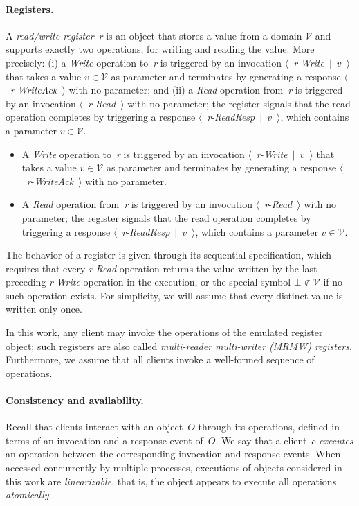 \documentclass[oribibl]{llncs}
\theoremstyle{definition-boldhead}
\newcommand{\var}[1]{\textit{#1}}
\newcommand{\op}[1]{\textsl{#1}}
\newcommand{\event}[2]{$\langle$~{\var{#1}}-\textsl{#2}~$\rangle$}
\newcommand{\eventt}[3]{$\langle$~{\var{#1}}-\textsl{#2}~$\mid$~{#3}~$\rangle$}
\newcommand{\values}{\ensuremath{\mathcal{V}}\xspace}
\begin{document}
\paragraph{Registers.}
A \emph{read/write register}~\var{r} is an object that stores a value from
a domain \values and supports exactly two operations, for writing and
reading the value.  More precisely:
\if\submit\yes
(i) a \emph{Write} operation to~\var{r} is triggered by an invocation \eventt{r}{Write}{$v$} that takes a value $v \in \values$ as parameter and terminates by generating a response \event{r}{WriteAck} with no parameter; and (ii) a \emph{Read} operation from~\var{r} is triggered by an invocation \event{r}{Read} with no parameter; the register signals that the read operation completes by triggering a response \eventt{r}{ReadResp}{$v$}, which contains a parameter $v \in \values$.
\else
\begin{itemize}
\item A \emph{Write} operation to~\var{r} is triggered by an
  invocation \eventt{r}{Write}{$v$} that takes a value $v \in \values$
  as parameter and terminates by generating a response
  \event{r}{WriteAck} with no parameter.
\item A \emph{Read} operation from~\var{r} is triggered by an invocation
  \event{r}{Read} with no parameter; the register signals that the
  read operation completes by triggering a response
  \eventt{r}{ReadResp}{$v$}, which contains a parameter $v \in
  \values$.
\end{itemize}
\fi
The behavior of a register is given through its sequential
specification, which requires that every \var{r}-\op{Read} operation
returns the value written by the last preceding \var{r}-\op{Write}
operation in the execution, or the special symbol $\bot \not\in
\values$ if no such operation exists. For simplicity, we will assume
that every distinct value is written only once.

In this work, any client may invoke the operations of the emulated
register object; such registers are also called \emph{multi-reader
  multi-writer (MRMW) registers}.  Furthermore, we assume that all
clients invoke a well-formed sequence of operations.


\paragraph{Consistency and availability.}
Recall that clients interact with an object~$O$ through its
operations, defined in terms of an invocation and a response event
of~$O$.  We say that a client~$c$ \emph{executes} an operation between
the corresponding invocation and response events.  When accessed
concurrently by multiple processes, executions of objects considered
in this work are \emph{linearizable}, that is, the object appears to
execute all operations \emph{atomically}.
\end{document}

